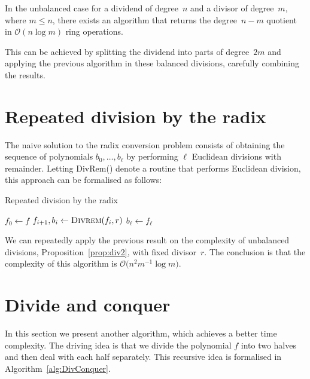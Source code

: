 \begin{prop} \label{prop:div2}
In the unbalanced case for a dividend of degree~$n$ and 
a divisor of degree~$m$, where $m \leq n$, there exists an 
algorithm that returns the degree~\mbox{$n-m$} quotient in 
$\mathcal{O}(n \log m)$ ring operations.
\end{prop}

This can be achieved by splitting the dividend into parts of degree~$2m$ 
and applying the previous algorithm in these balanced divisions, carefully 
combining the results.


\section{Repeated division by the radix}

The naive solution to the radix conversion problem consists of 
obtaining the sequence of polynomials $b_0, \dotsc, b_{\ell}$ 
by performing $\ell$ Euclidean divisions with remainder.  Letting 
{\sc DivRem()} denote a routine that performs Euclidean division, 
this approach can be formalised as follows:

\begin{algorithm}[H]
\caption{Repeated division by the radix}
\label{alg:RepeatedDivision}
\begin{algorithmic}
\vspace{1mm}
\State $f_0 \gets f$
\State $f_{i+1}, b_i \gets \Call{Divrem}{f_i, r}$
\EndFor
\State $b_{\ell} \gets f_{\ell}$
\EndProcedure
\end{algorithmic}
\end{algorithm}

We can repeatedly apply the previous result on the complexity 
of unbalanced divisions, Proposition~\ref{prop:div2}, with 
fixed divisor~$r$.  The conclusion is that the complexity 
of this algorithm is $\mathcal{O} \bigl( n^2 m^{-1} \log m \bigr)$.


\section{Divide and conquer}

In this section we present another algorithm, which achieves 
a better time complexity.  The driving idea is that we divide 
the polynomial $f$ into two halves and then deal with each half 
separately.  This recursive idea is formalised in 
Algorithm~\ref{alg:DivConquer}.

